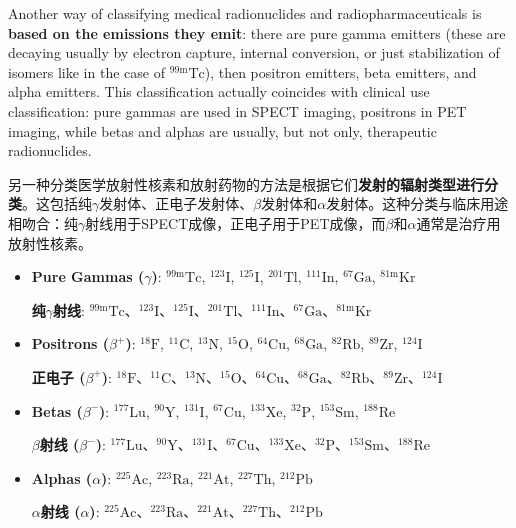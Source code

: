 \documentclass[dvipsnames, svgnames,a4paper,11pt]{article}
\begin{document}
Another way of classifying medical radionuclides and radiopharmaceuticals is \textbf{based on the emissions they emit}: there are pure gamma emitters (these are decaying usually by electron capture, internal conversion, or just stabilization of isomers like in the case of \(\mathrm{^{99m}Tc}\)), then positron emitters, beta emitters, and alpha emitters. This classification actually coincides with clinical use classification: pure gammas are used in SPECT imaging, positrons in PET imaging, while betas and alphas are usually, but not only, therapeutic radionuclides.  

另一种分类医学放射性核素和放射药物的方法是根据它们\textbf{发射的辐射类型进行分类}。这包括纯$\gamma$发射体、正电子发射体、$\beta$发射体和$\alpha$发射体。这种分类与临床用途相吻合：纯$\gamma$射线用于SPECT成像，正电子用于PET成像，而$\beta$和$\alpha$通常是治疗用放射性核素。

\begin{itemize}

      \item \textbf{Pure Gammas ($\gamma$)}: ${}^\text{99m}\text{Tc}$, ${}^\text{123}\text{I}$, ${}^\text{125}\text{I}$, ${}^\text{201}\text{Tl}$, ${}^\text{111}\text{In}$, ${}^\text{67}\text{Ga}$, ${}^\text{81m}\text{Kr}$

            \textbf{纯$\gamma$射线}: ${}^\text{99m}\text{Tc}$、${}^\text{123}\text{I}$、${}^\text{125}\text{I}$、${}^\text{201}\text{Tl}$、${}^\text{111}\text{In}$、${}^\text{67}\text{Ga}$、${}^\text{81m}\text{Kr}$

      \item \textbf{Positrons ($\beta^+$)}: ${}^\text{18}\text{F}$, ${}^\text{11}\text{C}$, ${}^\text{13}\text{N}$, ${}^\text{15}\text{O}$, ${}^\text{64}\text{Cu}$, ${}^\text{68}\text{Ga}$, ${}^\text{82}\text{Rb}$, ${}^\text{89}\text{Zr}$, ${}^\text{124}\text{I}$

            \textbf{正电子 ($\beta^+$)}: ${}^\text{18}\text{F}$、${}^\text{11}\text{C}$、${}^\text{13}\text{N}$、${}^\text{15}\text{O}$、${}^\text{64}\text{Cu}$、${}^\text{68}\text{Ga}$、${}^\text{82}\text{Rb}$、${}^\text{89}\text{Zr}$、${}^\text{124}\text{I}$

      \item \textbf{Betas ($\beta^-$)}: ${}^\text{177}\text{Lu}$, ${}^\text{90}\text{Y}$, ${}^\text{131}\text{I}$, ${}^\text{67}\text{Cu}$, ${}^\text{133}\text{Xe}$, ${}^\text{32}\text{P}$, ${}^\text{153}\text{Sm}$, ${}^\text{188}\text{Re}$

            \textbf{$\beta$射线 ($\beta^-$)}: ${}^\text{177}\text{Lu}$、${}^\text{90}\text{Y}$、${}^\text{131}\text{I}$、${}^\text{67}\text{Cu}$、${}^\text{133}\text{Xe}$、${}^\text{32}\text{P}$、${}^\text{153}\text{Sm}$、${}^\text{188}\text{Re}$

      \item \textbf{Alphas ($\alpha$)}: ${}^\text{225}\text{Ac}$, ${}^\text{223}\text{Ra}$, ${}^\text{221}\text{At}$, ${}^\text{227}\text{Th}$, ${}^\text{212}\text{Pb}$

            \textbf{$\alpha$射线 ($\alpha$)}: ${}^\text{225}\text{Ac}$、${}^\text{223}\text{Ra}$、${}^\text{221}\text{At}$、${}^\text{227}\text{Th}$、${}^\text{212}\text{Pb}$

\end{itemize}
\end{document}
